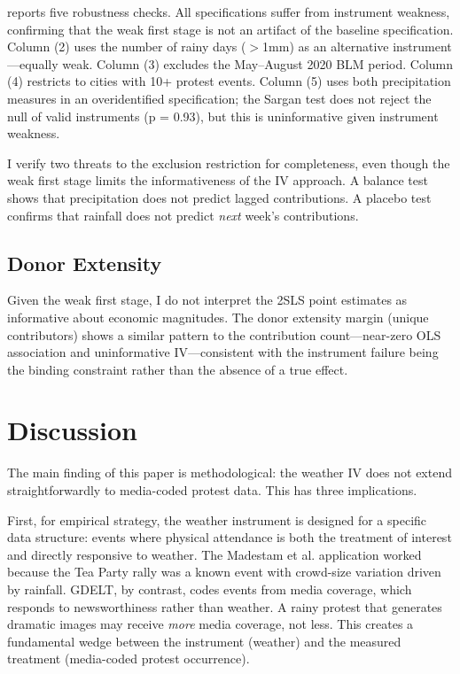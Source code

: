\documentclass[12pt]{article}
\begin{document}
 reports five robustness checks. All specifications suffer from instrument weakness, confirming that the weak first stage is not an artifact of the baseline specification. Column (2) uses the number of rainy days ($>$1mm) as an alternative instrument---equally weak. Column (3) excludes the May--August 2020 BLM period. Column (4) restricts to cities with 10+ protest events. Column (5) uses both precipitation measures in an overidentified specification; the Sargan test does not reject the null of valid instruments (p = 0.93), but this is uninformative given instrument weakness.

I verify two threats to the exclusion restriction for completeness, even though the weak first stage limits the informativeness of the IV approach. A balance test shows that precipitation does not predict lagged contributions. A placebo test confirms that rainfall does not predict \textit{next} week's contributions.



\subsection{Donor Extensity}

Given the weak first stage, I do not interpret the 2SLS point estimates as informative about economic magnitudes. The donor extensity margin (unique contributors) shows a similar pattern to the contribution count---near-zero OLS association and uninformative IV---consistent with the instrument failure being the binding constraint rather than the absence of a true effect.


\section{Discussion}
\label{sec:discussion}

The main finding of this paper is methodological: the \citet{madestam2013} weather IV does not extend straightforwardly to media-coded protest data. This has three implications.

First, for empirical strategy, the weather instrument is designed for a specific data structure: events where physical attendance is both the treatment of interest and directly responsive to weather. The Madestam et al. application worked because the Tea Party rally was a known event with crowd-size variation driven by rainfall. GDELT, by contrast, codes events from media coverage, which responds to newsworthiness rather than weather. A rainy protest that generates dramatic images may receive \textit{more} media coverage, not less. This creates a fundamental wedge between the instrument (weather) and the measured treatment (media-coded protest occurrence).
\end{document}
